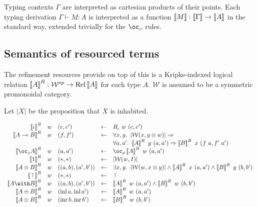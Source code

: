 Typing contexts $\Gamma$ are interpreted as cartesian products of their points.
Each typing derivation $\Gamma \vdash M : A$ is interpreted as a function
$\left\llbracket M \right\rrbracket : \left\llbracket \Gamma \right\rrbracket \to \left\llbracket A \right\rrbracket$ in the standard way, extended trivially for
the $\excl{\rho}{}$ rules.

\subsection{Semantics of resourced terms}

The refinement resources provide on top of this is a Kripke-indexed logical
relation $\left\llbracket A \right\rrbracket^R : \mathcal{W}^{op} \to \operatorname{Rel}\left\llbracket A \right\rrbracket$ for each type $A$.
$\mathcal{W}$ is assumed to be a symmetric promonoidal category.

Let $\left| X \right|$ be the proposition that $X$ is inhabited.

\begin{displaymath}
  \begin{array}{rllcl}
    \sem{\base}^R & w & (c,c') &\gets& R_\base~w~(c,c') \\
    \sem{\fun{A}{B}}^R & w & (f,f')
                               &\gets& \forall x,y.~
                                 \left| \mathcal W(x, y \otimes w) \right|
                                 \Rightarrow \\
    &&&& \forall a,a'.~\sem{A}^R~y~(a,a')
                                 \Rightarrow \sem{B}^R~x~(f~a,f'~a') \\
    \sem{\excl{\rho}{A}}^R & w & (a,a') &\gets& \oc_\rho \sem{A}^R~w~(a,a') \\
    \sem{\tensorOne}^R & w & (*,*) &\gets& \left|\mathcal W(w, I)\right| \\
    \sem{\tensor{A}{B}}^R & w & ((a,b),(a',b'))
                               &\gets& \exists x,y.~
                                 \left| \mathcal W(w, x \otimes y) \right|
                                 \wedge \sem{A}^R~x~(a,a')
                                 \wedge \sem{B}^R~y~(b,b') \\
    \sem{\withTOne}^R & w & (*,*) &\gets& \top \\
    \sem{\withT{A}{B}}^R & w & ((a,b),(a',b')) &\gets&
    \sem{A}^R~w~(a,a') \wedge \sem{B}^R~w~(b,b') \\
    \sem{\sumT{A}{B}}^R & w & (\operatorname{inl} a,\operatorname{inl} a')
                               &\gets& \sem{A}^R~w~(a,a') \\
    \sem{\sumT{A}{B}}^R & w & (\operatorname{inr} b,\operatorname{inr} b')
                               &\gets& \sem{B}^R~w~(b,b') \\
  \end{array}
\end{displaymath}

